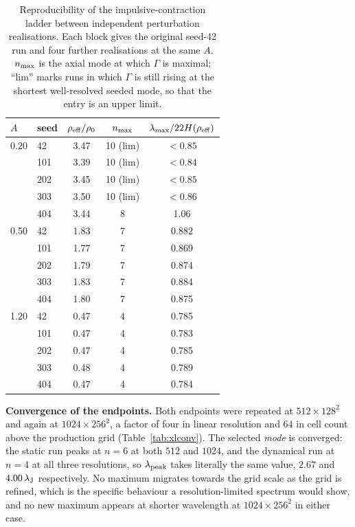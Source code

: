 \documentclass[usenatbib,twoside,twocolumn]{mnras}
\begin{document}
\begin{table}
\caption{Reproducibility of the impulsive-contraction ladder between independent perturbation realisations. Each block gives the original seed-42 run and four further realisations at the same $A$. $n_{\rm max}$ is the axial mode at which $\Gamma$ is maximal; ``lim'' marks runs in which $\Gamma$ is still rising at the shortest well-resolved seeded mode, so that the entry is an upper limit.}
\label{tab:seeds}
\footnotesize
\setlength{\tabcolsep}{4pt}
\begin{tabular}{llccc}
\toprule
$A$ & seed & $\rho_{\rm eff}/\rho_0$ & $n_{\rm max}$ & $\lambda_{\rm max}/22H(\rho_{\rm eff})$ \\
\midrule
0.20 & 42  & 3.47 & 10 (lim) & $<0.85$ \\
     & 101 & 3.39 & 10 (lim) & $<0.84$ \\
     & 202 & 3.45 & 10 (lim) & $<0.85$ \\
     & 303 & 3.50 & 10 (lim) & $<0.86$ \\
     & 404 & 3.44 & 8        & 1.06 \\
\midrule
0.50 & 42  & 1.83 & 7 & 0.882 \\
     & 101 & 1.77 & 7 & 0.869 \\
     & 202 & 1.79 & 7 & 0.874 \\
     & 303 & 1.83 & 7 & 0.884 \\
     & 404 & 1.80 & 7 & 0.875 \\
\midrule
1.20 & 42  & 0.47 & 4 & 0.785 \\
     & 101 & 0.47 & 4 & 0.783 \\
     & 202 & 0.47 & 4 & 0.785 \\
     & 303 & 0.48 & 4 & 0.789 \\
     & 404 & 0.47 & 4 & 0.784 \\
\bottomrule
\end{tabular}
\end{table}

\smallskip\noindent\textbf{Convergence of the endpoints.} Both endpoints were repeated at $512\times128^2$ and again at $1024\times256^2$, a factor of four in linear resolution and $64$ in cell count above the production grid (Table~\ref{tab:xlconv}). The selected \emph{mode} is converged: the static run peaks at $n=6$ at both $512$ and $1024$, and the dynamical run at $n=4$ at all three resolutions, so $\lambda_{\rm peak}$ takes literally the same value, $2.67$ and $4.00\,\lambda_{\rm J}$ respectively. No maximum migrates towards the grid scale as the grid is refined, which is the specific behaviour a resolution-limited spectrum would show, and no new maximum appears at shorter wavelength at $1024\times256^2$ in either case.
\end{document}
